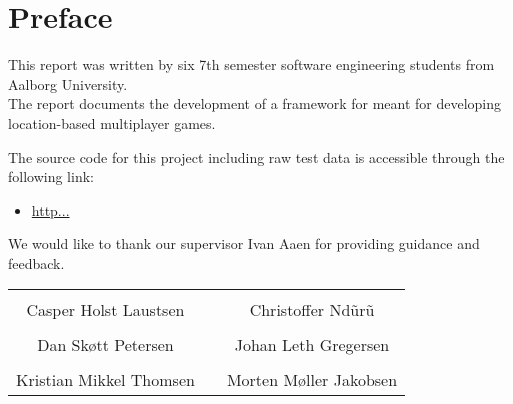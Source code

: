 \thispagestyle{empty}
\section*{Preface}
This report was written by six 7th semester software engineering students from Aalborg University.\\

\noindent The report documents the development of a framework for meant for developing location-based multiplayer games.

\noindent The source code for this project including raw test data is accessible through the following link:
\begin{itemize}
\item \url{http...}
\end{itemize}

\vspace{.2cm}
\noindent We would like to thank our supervisor Ivan Aaen for providing guidance and feedback.

\begin{table}[H]
	\centering
	\vspace{2cm}
		\begin{tabular}{c c c}
			\underline{\phantom{JAERJAERJAERJAERGO}} & \phantom{cookies} & \underline{\phantom{JAERJAERJAERJAERGO}} \\
			Casper Holst Laustsen & \phantom{cookies} & Christoffer Ndũrũ\\[1.5cm]
		    \underline{\phantom{JAERJAERJAERJAERGO}} & \phantom{cookies} & \underline{\phantom{JAERJAERJAERJAERGO}} \\
			Dan Skøtt Petersen & \phantom{cookies} & Johan Leth Gregersen\\[1.5cm]
			\underline{\phantom{JAERJAERJAERJAERGO}} & \phantom{cookies} & \underline{\phantom{JAERJAERJAERJAERGO}} \\ 
			Kristian Mikkel Thomsen & \phantom{cookies} & Morten Møller Jakobsen\\[.5cm]				
		\end{tabular}
\end{table}
